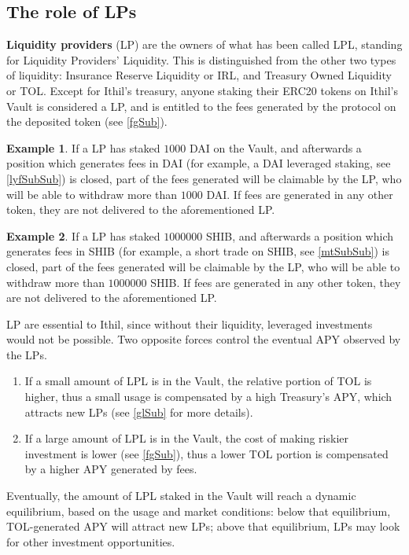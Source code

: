 \documentclass[a4paper,10 pt]{article}
\theoremstyle{definition}
\newtheorem{example}{Example}
\begin{document}
\subsection{The role of LPs}\label{lpSub}
{\bf Liquidity providers} (LP) are the owners of what has been called LPL, standing for Liquidity Providers' Liquidity. This is distinguished from the other two types of liquidity: Insurance Reserve Liquidity or IRL, and Treasury Owned Liquidity or TOL. Except for Ithil's treasury, anyone staking their ERC20 tokens on Ithil's Vault is considered a LP, and is entitled to the fees generated by the protocol on the deposited token (see \ref{fgSub}).

\begin{example}
If a LP has staked $1000$ DAI on the Vault, and afterwards a position which generates fees in DAI (for example, a DAI leveraged staking, see \ref{lyfSubSub}) is closed, part of the fees generated will be claimable by the LP, who will be able to withdraw more than $1000$ DAI. If fees are generated in any other token, they are not delivered to the aforementioned LP.
\end{example}

\begin{example}
If a LP has staked $1000000$ SHIB, and afterwards a position which generates fees in SHIB (for example, a short trade on SHIB, see \ref{mtSubSub}) is closed, part of the fees generated will be claimable by the LP, who will be able to withdraw more than $1000000$ SHIB. If fees are generated in any other token, they are not delivered to the aforementioned LP.
\end{example}

LP are essential to Ithil, since without their liquidity, leveraged investments would not be possible. Two opposite forces control the eventual APY observed by the LPs.
\begin{enumerate}
\item If a small amount of LPL is in the Vault, the relative portion of TOL is higher, thus a small usage is compensated by a high Treasury's APY, which attracts new LPs (see \ref{glSub} for more details).
\item If a large amount of LPL is in the Vault, the cost of making riskier investment is lower (see \ref{fgSub}), thus a lower TOL portion is compensated by a higher APY generated by fees.
\end{enumerate}

Eventually, the amount of LPL staked in the Vault will reach a dynamic equilibrium, based on the usage and market conditions: below that equilibrium, TOL-generated APY will attract new LPs; above that equilibrium, LPs may look for other investment opportunities.
\end{document}
